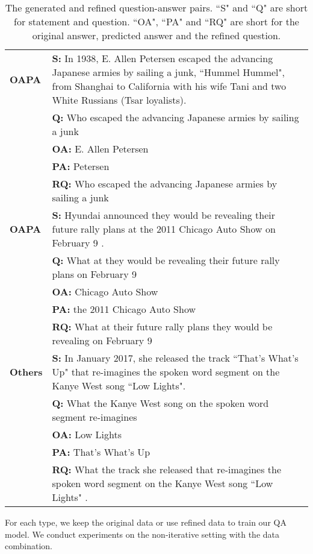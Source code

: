 \documentclass[11pt,a4paper]{article}
\begin{document}
\begin{table*}[t!]
\centering
\begin{tabular}{lp{13cm}}
\toprule
\textbf{OAPA} 
& \textbf{S:} In 1938, E. Allen Petersen escaped the advancing Japanese armies by sailing a junk, ``Hummel Hummel", from Shanghai to California with his wife Tani and two White Russians (Tsar loyalists).  \\
& \textbf{Q:} Who escaped the advancing Japanese armies by sailing a junk   \\
& \textbf{OA:} E. Allen Petersen   \\
& \textbf{PA:} Petersen \\
& \textbf{RQ:} Who escaped the advancing Japanese armies by sailing a junk  \\ \midrule
\textbf{OAPA}
& \textbf{S:} Hyundai announced they would be revealing their future rally plans at the 2011 Chicago Auto Show on February 9 .  \\
& \textbf{Q:} What at they would be revealing their future rally plans on February 9  \\
& \textbf{OA:} Chicago Auto Show  \\
& \textbf{PA:} the 2011 Chicago Auto Show \\
& \textbf{RQ:} What at their future rally plans they would be revealing on February 9 \\ \midrule
\textbf{Others}
& \textbf{S:} In January 2017, she released the track ``That's What's Up" that re-imagines the spoken word segment on the Kanye West song ``Low Lights". \\
& \textbf{Q:} What the Kanye West song on the spoken word segment re-imagines  \\
& \textbf{OA:} Low Lights  \\
& \textbf{PA:} That's What's Up  \\
& \textbf{RQ:} What the track she released that re-imagines the spoken word segment on the Kanye West song ``Low Lights" . \\
\bottomrule
\end{tabular}
\caption{The generated and refined question-answer pairs. ``S" and ``Q" are short for statement and question. ``OA", ``PA" and ``RQ" are short for the original answer, predicted answer and the refined question.}
\label{tab:examples}
\end{table*}


For each type, we keep the original data or use refined data to train our QA model.
We conduct experiments on the non-iterative setting with the data combination.
\end{document}
